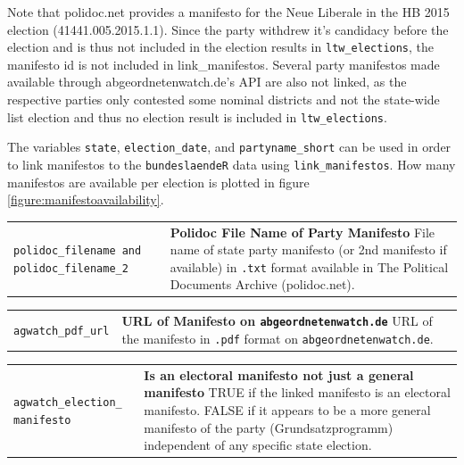 \documentclass[
]{scrartcl}
\begin{document}
Note that polidoc.net provides a manifesto for the Neue Liberale in the
HB 2015 election (41441.005.2015.1.1). Since the party withdrew it's
candidacy before the election and is thus not included in the election
results in \texttt{ltw\_elections}, the manifesto id is not included in
link\_manifestos. Several party manifestos made available through
abgeordnetenwatch.de's API are also not linked, as the respective
parties only contested some nominal districts and not the state-wide
list election and thus no election result is included in
\texttt{ltw\_elections}.

The variables \texttt{state}, \texttt{election\_date}, and
\texttt{partyname\_short} can be used in order to link manifestos to the
\texttt{bundeslaendeR} data using \texttt{link\_manifestos}. How many
manifestos are available per election is plotted in
figure\(~\)\ref{figure:manifestoavailability}.

\begin{longtable}{p{3.2cm}| p{11cm}}
\texttt{polidoc\_filename and polidoc\_filename\_2} &\textbf{Polidoc File Name of Party Manifesto}\newline 
File name of state party manifesto (or 2nd manifesto if available) in \texttt{.txt} format available in The Political Documents Archive (polidoc.net).
\end{longtable}

\begin{longtable}{p{3.2cm}| p{11cm}}
\texttt{agwatch\_pdf\_url} &\textbf{URL of Manifesto on \texttt{abgeordnetenwatch.de}}\newline 
URL of the manifesto in \texttt{.pdf} format on \texttt{abgeordnetenwatch.de}.
\end{longtable}

\begin{longtable}{p{3.2cm}| p{11cm}}
\texttt{agwatch\_election\_
manifesto} &\textbf{Is an electoral manifesto not just a general manifesto}\newline 
TRUE if the linked manifesto is an electoral manifesto. FALSE if it appears to be a more general manifesto of the party (Grundsatzprogramm) independent of any specific state election.
\end{longtable}

\newpage
\end{document}

